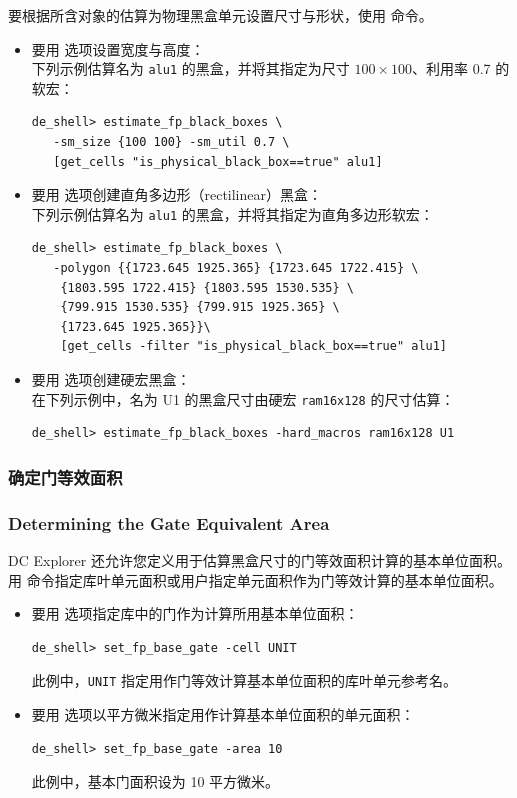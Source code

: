 要根据所含对象的估算为物理黑盒单元设置尺寸与形状，使用  命令。
\begin{itemize}
  \item 要用  选项设置宽度与高度：\\
        下列示例估算名为 \texttt{alu1} 的黑盒，并将其指定为尺寸 $100\times100$、利用率 0.7 的软宏：
\begin{lstlisting}
de_shell> estimate_fp_black_boxes \
   -sm_size {100 100} -sm_util 0.7 \
   [get_cells "is_physical_black_box==true" alu1]
\end{lstlisting}

  \item 要用  选项创建直角多边形（rectilinear）黑盒：\\
        下列示例估算名为 \texttt{alu1} 的黑盒，并将其指定为直角多边形软宏：
\begin{lstlisting}
de_shell> estimate_fp_black_boxes \
   -polygon {{1723.645 1925.365} {1723.645 1722.415} \
    {1803.595 1722.415} {1803.595 1530.535} \
    {799.915 1530.535} {799.915 1925.365} \
    {1723.645 1925.365}}\
    [get_cells -filter "is_physical_black_box==true" alu1]
\end{lstlisting}

  \item 要用 \opt{-hard\_macros} 选项创建硬宏黑盒：\\
        在下列示例中，名为 U1 的黑盒尺寸由硬宏 \texttt{ram16x128} 的尺寸估算：
\begin{lstlisting}
de_shell> estimate_fp_black_boxes -hard_macros ram16x128 U1
\end{lstlisting}
\end{itemize}

\subsubsection{确定门等效面积}
\subsubsection*{Determining the Gate Equivalent Area}

DC Explorer 还允许您定义用于估算黑盒尺寸的门等效面积计算的基本单位面积。
用  命令指定库叶单元面积或用户指定单元面积作为门等效计算的基本单位面积。
\begin{itemize}
  \item 要用  选项指定库中的门作为计算所用基本单位面积：
\begin{lstlisting}
de_shell> set_fp_base_gate -cell UNIT
\end{lstlisting}
        此例中，\texttt{UNIT} 指定用作门等效计算基本单位面积的库叶单元参考名。

  \item 要用  选项以平方微米指定用作计算基本单位面积的单元面积：
\begin{lstlisting}
de_shell> set_fp_base_gate -area 10
\end{lstlisting}
        此例中，基本门面积设为 10 平方微米。
\end{itemize}

